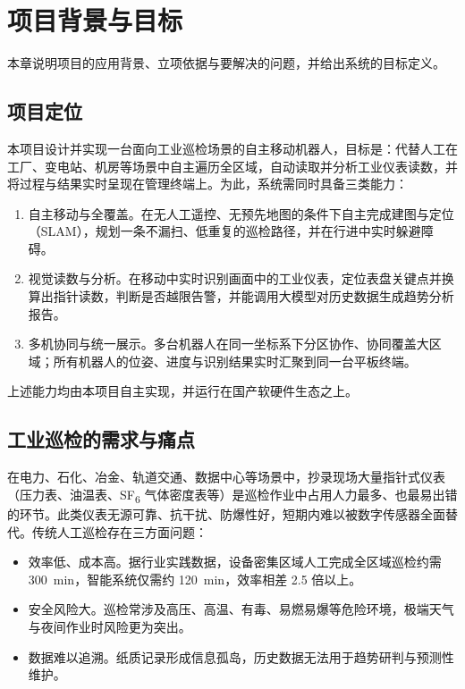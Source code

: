 \chapter{项目背景与目标}
\label{ch:problems}

本章说明项目的应用背景、立项依据与要解决的问题，并给出系统的目标定义。

\section{项目定位}
\label{sec:positioning}

本项目设计并实现一台面向工业巡检场景的自主移动机器人，目标是：代替人工在工厂、变电站、机房等场景中自主遍历全区域，自动读取并分析工业仪表读数，并将过程与结果实时呈现在管理终端上。为此，系统需同时具备三类能力：

\begin{enumerate}
\item 自主移动与全覆盖。在无人工遥控、无预先地图的条件下自主完成建图与定位（SLAM），规划一条不漏扫、低重复的巡检路径，并在行进中实时躲避障碍。
\item 视觉读数与分析。在移动中实时识别画面中的工业仪表，定位表盘关键点并换算出指针读数，判断是否越限告警，并能调用大模型对历史数据生成趋势分析报告。
\item 多机协同与统一展示。多台机器人在同一坐标系下分区协作、协同覆盖大区域；所有机器人的位姿、进度与识别结果实时汇聚到同一台平板终端。
\end{enumerate}

上述能力均由本项目自主实现，并运行在国产软硬件生态之上。

\section{工业巡检的需求与痛点}
\label{sec:inspection-need}

在电力、石化、冶金、轨道交通、数据中心等场景中，抄录现场大量指针式仪表（压力表、油温表、SF\textsubscript{6} 气体密度表等）是巡检作业中占用人力最多、也最易出错的环节。此类仪表无源可靠、抗干扰、防爆性好，短期内难以被数字传感器全面替代。传统人工巡检存在三方面问题：

\begin{itemize}
\item 效率低、成本高。据行业实践数据，设备密集区域人工完成全区域巡检约需 300~min，智能系统仅需约 120~min，效率相差 2.5 倍以上。
\item 安全风险大。巡检常涉及高压、高温、有毒、易燃易爆等危险环境，极端天气与夜间作业时风险更为突出。
\item 数据难以追溯。纸质记录形成信息孤岛，历史数据无法用于趋势研判与预测性维护。
\end{itemize}

